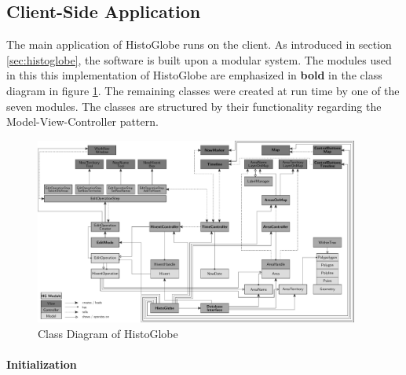 

\subsection{Client-Side Application} %
\label{sub:client_side_application}

The main application of HistoGlobe runs on the client. As introduced in section \ref{sec:histoglobe}, the software is built upon a modular system. The modules used in this this implementation of HistoGlobe are emphasized in \textbf{bold} in the class diagram in figure \ref{fig:class_diagram}. The remaining classes were created at run time by one of the seven modules. The classes are structured by their functionality regarding the Model-View-Controller pattern.

\begin{figure}
  \centering
  \includegraphics[width=0.95\textwidth]{graphics/development/implementation/class_diagram}
  \vspace{1em}
  \caption{Class Diagram of HistoGlobe}
  \label{fig:class_diagram}
\end{figure}

\newpage %
\paragraph{Initialization} %
\label{par:initialization}

